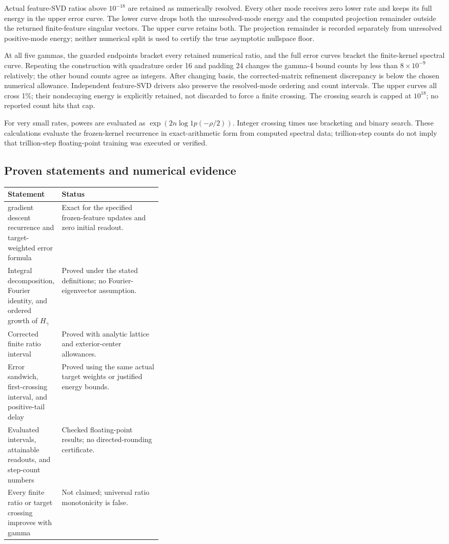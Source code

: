 \documentclass[11pt]{article}
\begin{document}
Actual feature-SVD ratios above \(10^{-18}\) are retained as numerically resolved. Every other mode receives zero lower rate and keeps its full energy in the upper error curve. The lower curve drops both the unresolved-mode energy and the computed projection remainder outside the returned finite-feature singular vectors. The upper curve retains both. The projection remainder is recorded separately from unresolved positive-mode energy; neither numerical split is used to certify the true asymptotic nullspace floor.

At all five gammas, the guarded endpoints bracket every retained numerical ratio, and the full error curves bracket the finite-kernel spectral curve. Repeating the construction with quadrature order 16 and padding 24 changes the gamma-4 bound counts by less than \(8\times10^{-9}\) relatively; the other bound counts agree as integers. After changing basis, the corrected-matrix refinement discrepancy is below the chosen numerical allowance. Independent feature-SVD drivers also preserve the resolved-mode ordering and count intervals. The upper curves all cross 1\%; their nondecaying energy is explicitly retained, not discarded to force a finite crossing. The crossing search is capped at \(10^{18}\); no reported count hits that cap.

For very small rates, powers are evaluated as \(\exp(2n\log1p(-\rho/2))\). Integer crossing times use bracketing and binary search. These calculations evaluate the frozen-kernel recurrence in exact-arithmetic form from computed spectral data; trillion-step counts do not imply that trillion-step floating-point training was executed or verified.

\subsection{Proven statements and numerical evidence}

\begin{center}\small\begin{tabularx}{\linewidth}{p{0.35\linewidth}X}
\toprule
Statement & Status \\
\midrule
gradient descent recurrence and target-weighted error formula & Exact for the specified frozen-feature updates and zero initial readout. \\
Integral decomposition, Fourier identity, and ordered growth of \(H_\gamma\) & Proved under the stated definitions; no Fourier-eigenvector assumption. \\
Corrected finite ratio interval & Proved with analytic lattice and exterior-center allowances. \\
Error sandwich, first-crossing interval, and positive-tail delay & Proved using the same actual target weights or justified energy bounds. \\
Evaluated intervals, attainable readouts, and step-count numbers & Checked floating-point results; no directed-rounding certificate. \\
Every finite ratio or target crossing improves with gamma & Not claimed; universal ratio monotonicity is false. \\
\bottomrule\end{tabularx}\end{center}
\end{document}
